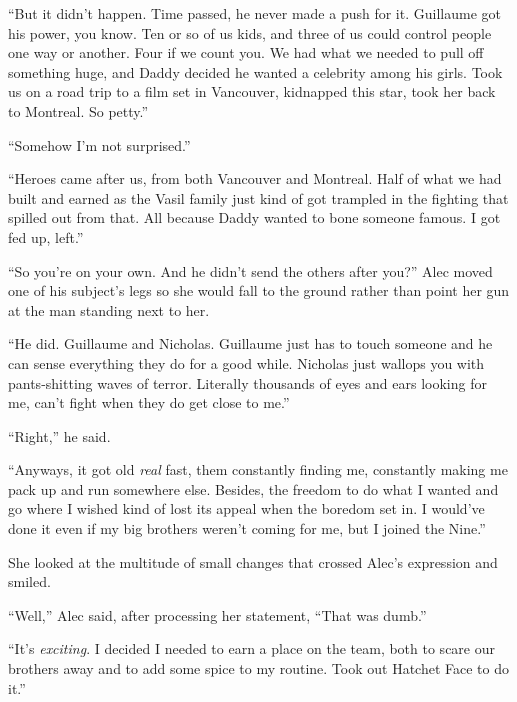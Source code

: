 ``But it didn't happen.  Time passed, he never made a push for it.  Guillaume got his power, you know.  Ten or so of us kids, and three of us could control people one way or another.  Four if we count you.  We had what we needed to pull off something huge, and Daddy decided he wanted a celebrity among his girls.  Took us on a road trip to a film set in Vancouver, kidnapped this star, took her back to Montreal.  So petty.''



``Somehow I'm not surprised.''



``Heroes came after us, from both Vancouver and Montreal.  Half of what we had built and earned as the Vasil family just kind of got trampled in the fighting that spilled out from that.  All because Daddy wanted to bone someone famous.  I got fed up, left.''



``So you're on your own.  And he didn't send the others after you?''  Alec moved one of his subject's legs so she would fall to the ground rather than point her gun at the man standing next to her.



``He did.  Guillaume and Nicholas.  Guillaume just has to touch someone and he can sense everything they do for a good while.  Nicholas just wallops you with pants-shitting waves of terror.  Literally thousands of eyes and ears looking for me, can't fight when they do get close to me.''



``Right,'' he said.



``Anyways, it got old \emph{real} fast, them constantly finding me, constantly making me pack up and run somewhere else. Besides, the freedom to do what I wanted and go where I wished kind of lost its appeal when the boredom set in.  I would've done it even if my big brothers weren't coming for me, but I joined the Nine.''



She looked at the multitude of small changes that crossed Alec's expression and smiled.



``Well,'' Alec said, after processing her statement, ``That was dumb.''



``It's \emph{exciting}.  I decided I needed to earn a place on the team, both to scare our brothers away and to add some spice to my routine.  Took out Hatchet Face to do it.''




